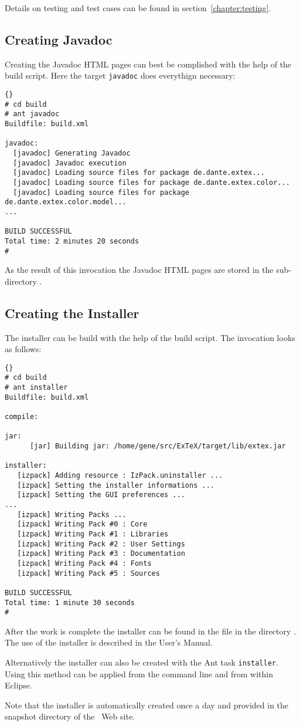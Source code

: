 Details on testing and test cases can be found in
section~\ref{chapter:testing}.


\subsection{Creating Javadoc}\label{sec:shell-javadoc}

Creating the Javadoc HTML pages can best be complished with the help
of the build script. Here the target \texttt{javadoc} does everythign
necessary:

\begin{lstlisting}{}
# cd build
# ant javadoc
Buildfile: build.xml

javadoc:
  [javadoc] Generating Javadoc
  [javadoc] Javadoc execution
  [javadoc] Loading source files for package de.dante.extex...
  [javadoc] Loading source files for package de.dante.extex.color...
  [javadoc] Loading source files for package de.dante.extex.color.model...
...

BUILD SUCCESSFUL
Total time: 2 minutes 20 seconds
#
\end{lstlisting}{}

As the result of this invocation the Javadoc HTML pages are stored in
the sub-directory .


\subsection{Creating the Installer}\label{sec:shell-installer}

The installer can be build with the help of the build script. The
invocation looks as follows:

\begin{lstlisting}{}
# cd build
# ant installer
Buildfile: build.xml

compile:

jar:
      [jar] Building jar: /home/gene/src/ExTeX/target/lib/extex.jar

installer:
   [izpack] Adding resource : IzPack.uninstaller ...
   [izpack] Setting the installer informations ...
   [izpack] Setting the GUI preferences ...
... 
   [izpack] Writing Packs ...
   [izpack] Writing Pack #0 : Core
   [izpack] Writing Pack #1 : Libraries
   [izpack] Writing Pack #2 : User Settings
   [izpack] Writing Pack #3 : Documentation
   [izpack] Writing Pack #4 : Fonts
   [izpack] Writing Pack #5 : Sources

BUILD SUCCESSFUL
Total time: 1 minute 30 seconds
#
\end{lstlisting}{}

After the work is complete the installer can be found in the file
 in the directory . The use of the
installer is described in the User's Manual.

Alternatively the installer can also be created with the Ant task
\texttt{installer}. Using this method can be applied from the command
line and from within Eclipse.

Note that the installer is automatically created once a day and
provided in the snapshot directory of the \ExTeX\ Web site.

